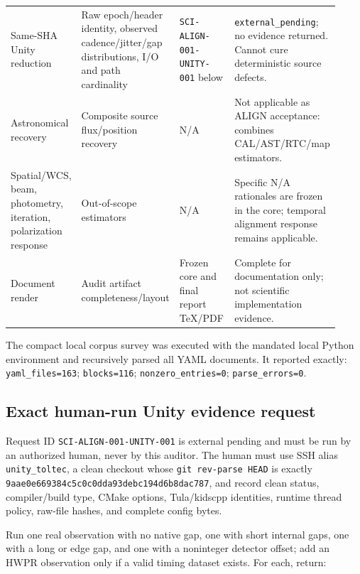 \documentclass[11pt]{article}
\newcommand{\code}[1]{\nolinkurl{#1}}
\newcommand{\AuditGoverningSHAPrint}{\code{9aae0e669384c5c0c0dd}\allowbreak\code{a93debc194d6b8dac787}}
\begin{document}
\begin{longtable}{L{0.20\linewidth}L{0.25\linewidth}L{0.24\linewidth}L{0.23\linewidth}}
Same-SHA Unity reduction & Raw epoch/header identity, observed cadence/jitter/gap distributions, I/O and path cardinality & \code{SCI-ALIGN-001-}\newline\code{UNITY-001} below & \texttt{external\_pending}; no evidence returned.  Cannot cure deterministic source defects.\\
Astronomical recovery & Composite source flux/position recovery & N/A & Not applicable as ALIGN acceptance: combines CAL/AST/RTC/map estimators.\\
Spatial/WCS, beam, photometry, iteration, polarization response & Out-of-scope estimators & N/A & Specific N/A rationales are frozen in the core; temporal alignment response remains applicable.\\
Document render & Audit artifact completeness/layout & Frozen core and final report TeX/PDF & Complete for documentation only; not scientific implementation evidence.\\
\bottomrule
\end{longtable}

The compact local corpus survey was executed with the mandated local Python
environment and recursively parsed all YAML documents.  It reported exactly:
\code{yaml_files=163}; \code{blocks=116}; \code{nonzero_entries=0};
\code{parse_errors=0}.

\subsection{Exact human-run Unity evidence request}

Request ID \code{SCI-ALIGN-001-UNITY-001} is external pending and must be run
by an authorized human, never by this auditor.  The human must use SSH alias
\code{unity_toltec}, a clean checkout whose \texttt{git rev-parse HEAD} is
exactly \AuditGoverningSHAPrint, and record clean status, compiler/build
type, CMake options, Tula/kidscpp identities, runtime thread policy, raw-file
hashes, and complete config bytes.

Run one real observation with no native gap, one with short internal gaps, one
with a long or edge gap, and one with a noninteger detector offset; add an
HWPR observation only if a valid timing dataset exists.  For each, return:
\end{document}

